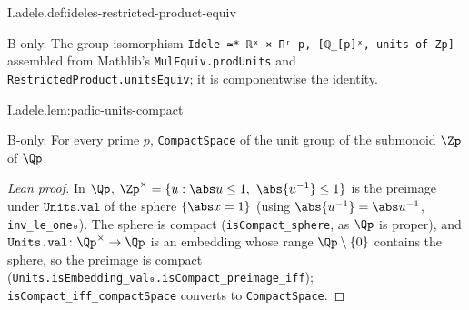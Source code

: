 \begin{definition}[the identification $\A^\times=\R^\times\times\prod'_p(\Qp^\times,\Zp^\times)$]
\bonly
{}
\end{definition}
\begin{tfformal}{I.adele.def:ideles-restricted-product-equiv}
\begin{tffidelity}
B-only. The group isomorphism \texttt{Idele ≃* ℝˣ × Πʳ p, [ℚ\_[p]ˣ, units of Zp]} assembled from Mathlib's \texttt{MulEquiv.prodUnits} and \texttt{RestrictedProduct.unitsEquiv}; it is componentwise the identity.
\end{tffidelity}
\end{tfformal}

\begin{lemma}
\bonly
{}
\end{lemma}
\begin{tfformal}{I.adele.lem:padic-units-compact}
\begin{tffidelity}
B-only. For every prime $p$, \texttt{CompactSpace} of the unit group of the submonoid $\Zp$ of $\Qp$.
\end{tffidelity}
\end{tfformal}
\begin{proof}[Lean proof]
In $\Qp$, $\Zp^\times=\{u:\abs u\le1,\ \abs{u^{-1}}\le1\}$ is the preimage under $\texttt{Units.val}$ of the sphere $\{\abs x=1\}$ (using $\abs{u^{-1}}=\abs u^{-1}$, \texttt{inv\_le\_one₀}). The sphere is compact (\texttt{isCompact\_sphere}, as $\Qp$ is proper), and $\texttt{Units.val}\colon\Qp^\times\to\Qp$ is an embedding whose range $\Qp\setminus\{0\}$ contains the sphere, so the preimage is compact (\texttt{Units.isEmbedding\_val₀.isCompact\_preimage\_iff}); \texttt{isCompact\_iff\_compactSpace} converts to \texttt{CompactSpace}.
\end{proof}

